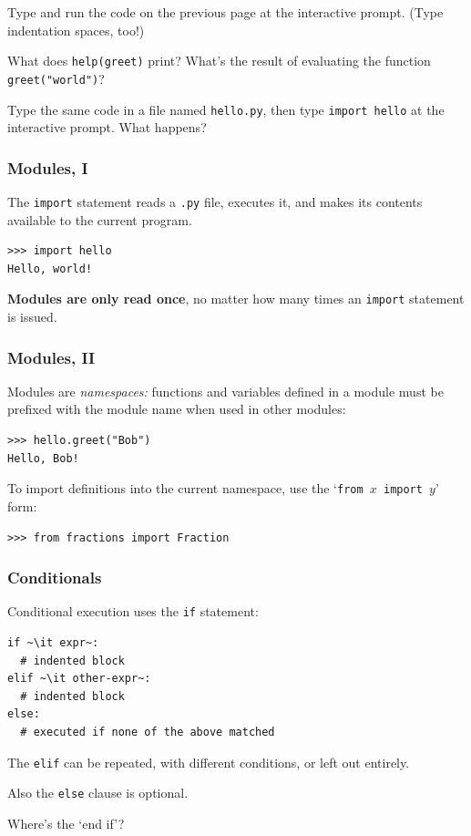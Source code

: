 \documentclass[english,serif,mathserif,xcolor=pdftex,dvipsnames,table]{beamer}
\begin{document}
\begin{frame}
  \begin{exercise}
    Type and run the code on the previous page at the interactive
    prompt. (Type indentation spaces, too!)

    What does \texttt{help(greet)} print?
    What's the result of evaluating the function \texttt{greet("world")}?
  \end{exercise}

  \+
  \begin{exercise}
    Type the same code in a file named \texttt{hello.py}, then type
    \texttt{import hello} at the interactive prompt.
    What happens?
  \end{exercise}
\end{frame}


\begin{frame}[fragile]
  \frametitle{Modules, I}
  The \texttt{import} statement reads a \texttt{.py} file, executes
  it, and makes its contents available to the current program.
\begin{lstlisting}
>>> import hello
Hello, world!
\end{lstlisting}

  \+
  \textbf{Modules are only read once}, no matter how many times an
  \texttt{import} statement is issued.
\end{frame}


\begin{frame}[fragile]
  \frametitle{Modules, II}
  Modules are \emph{namespaces:} functions and variables defined in
  a module must be prefixed with the module name when used in other
  modules:
\begin{lstlisting}
>>> hello.greet("Bob")
Hello, Bob!
\end{lstlisting}

  \+
  To import definitions into the current namespace, use the
  `\texttt{from $x$ import $y$}' form:
\begin{lstlisting}
>>> from fractions import Fraction
\end{lstlisting}
\end{frame}


\begin{frame}[fragile]
  \frametitle{Conditionals}
  Conditional execution uses the \texttt{if} statement:
\begin{lstlisting}
if ~\it expr~:
  # indented block
elif ~\it other-expr~:
  # indented block
else:
  # executed if none of the above matched
\end{lstlisting}

  \+The \texttt{elif} can be repeated, with different conditions, or
  left out entirely.

  \+
  Also the \texttt{else} clause is optional.

  \+
  \begin{question}
    Where's the `end if'?

  \end{question}
\end{frame}
\end{document}
